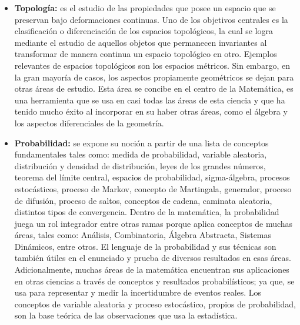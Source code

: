 \begin{itemize}
    \color{blue} \item \color{black} \textbf{Topología:} es el estudio de las propiedades que posee un espacio que se preservan bajo deformaciones continuas. Uno de los objetivos centrales es la clasificación o diferenciación de los espacios topológicos, la cual se logra mediante el estudio de aquellos objetos que permanecen invariantes al transformar de manera continua un espacio topológico en otro. Ejemplos relevantes de espacios topológicos son los espacios métricos. Sin embargo, en la gran mayoría de casos, los aspectos propiamente geométricos se dejan para otras áreas de estudio. Esta área se concibe en el centro de la Matemática, es una herramienta que se usa en casi todas las áreas de esta ciencia y que ha tenido mucho éxito al incorporar en su haber otras áreas, como el álgebra y los aspectos diferenciales de la geometría.
    
     \color{blue} \item \color{black} \textbf{Probabilidad:} se expone su noción a partir de una lista de conceptos fundamentales tales como: medida de probabilidad, variable aleatoria, distribución y densidad de distribución, leyes de los grandes números, teorema del límite central, espacios de probabilidad, sigma-álgebra, procesos estocásticos, proceso de Markov, concepto de Martingala, generador, proceso de difusión, proceso de saltos, conceptos de cadena, caminata aleatoria, distintos tipos de convergencia. Dentro de la matemática, la probabilidad juega un rol integrador entre otras ramas porque aplica conceptos de muchas áreas, tales como: Análisis, Combinatoria, Álgebra Abstracta, Sistemas Dinámicos, entre otros. El lenguaje de la probabilidad y sus técnicas son también útiles en el enunciado y prueba de diversos resultados en esas áreas. Adicionalmente, muchas áreas de la matemática encuentran sus aplicaciones en otras ciencias a través de conceptos y resultados probabilísticos; ya que, se usa para representar y medir la incertidumbre de eventos reales. Los conceptos de variable aleatoria y proceso estocástico, propios de probabilidad, son la base teórica de las observaciones que usa la estadística.
     

\end{itemize}
